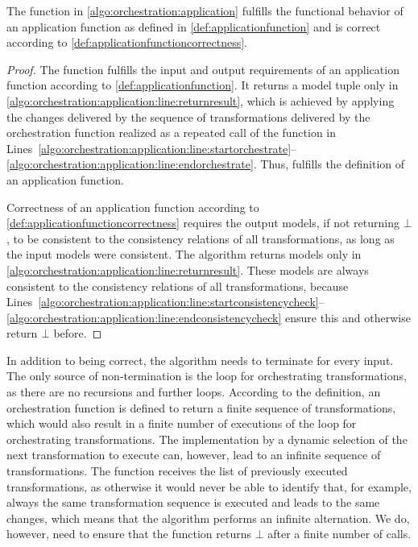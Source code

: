 \begin{theorem}
    The  function in \autoref{algo:orchestration:application} fulfills the functional behavior of an application function as defined in \autoref{def:applicationfunction} and is correct according to \autoref{def:applicationfunctioncorrectness}.
\end{theorem}
\begin{proof}
    The  function fulfills the input and output requirements of an application function according to \autoref{def:applicationfunction}.
    It returns a model tuple only in \autoref{algo:orchestration:application:line:returnresult}, which is achieved by applying the changes delivered by the sequence of transformations delivered by the orchestration function realized as a repeated call of the  function in Lines~\ref{algo:orchestration:application:line:startorchestrate}--\ref{algo:orchestration:application:line:endorchestrate}.
    Thus,  fulfills the definition of an application function.

    Correctness of an application function according to \autoref{def:applicationfunctioncorrectness} requires the output models, if not returning $\bot$, to be consistent to the consistency relations of all transformations, as long as the input models were consistent.
    The algorithm returns models only in \autoref{algo:orchestration:application:line:returnresult}.
    These models are always consistent to the consistency relations of all transformations, because Lines~\ref{algo:orchestration:application:line:startconsistencycheck}--\ref{algo:orchestration:application:line:endconsistencycheck} ensure this and otherwise return $\bot$ before.
\end{proof}

In addition to being correct, the algorithm needs to terminate for every input.
The only source of non-termination is the loop for orchestrating transformations, as there are no recursions and further loops.
According to the definition, an orchestration function is defined to return a finite sequence of transformations, which would also result in a finite number of executions of the loop for orchestrating transformations.
The implementation by a dynamic selection of the next transformation to execute can, however, lead to an infinite sequence of transformations.
The  function receives the list of previously executed transformations, as otherwise it would never be able to identify that, for example, always the same transformation sequence is executed and leads to the same changes, which means that the algorithm performs an infinite alternation.
We do, however, need to ensure that the  function returns $\bot$ after a finite number of calls.

